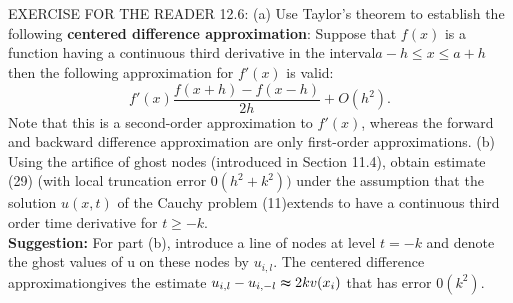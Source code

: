 \documentclass[../main.tex]{subfiles}
\begin{document}
{{\\
\\
EXERCISE FOR THE READER 12.6: (a) Use Taylor's theorem to establish the following \textbf{centered difference approximation}: Suppose that $f(x)$ is a function having a continuous third derivative in the interval$ a-h\leqslant x \leqslant a + h$ then the following approximation for $f'(x)$ is valid: 	
\begin{equation}
	f'(x)\dfrac{f(x+h)-f(x-h)}{2h}+O(h^2).
\end{equation}
Note that this is a second-order approximation to $f'(x)$, whereas the forward and backward difference approximation are only first-order approximations. (b) Using the artifice of ghost nodes (introduced in Section 11.4), obtain estimate (29) (with local truncation error $0(h^2 +k^2))$ under the assumption that the solution $u(x,t)$ of the Cauchy problem (11)extends to have a continuous third order time derivative for $t \geq -k$.
\\ 
\textbf{Suggestion:} For part (b), introduce a line of nodes at level $t = -k$ and denote the ghost values of u on these nodes by $u_{i,l}$. The centered difference approximationgives the estimate $u_{i,l}-u_{i,-l}\thickapprox 2kv(x_i) $ that has error $0(k^2)$. 
\\

}}
\end{document}
